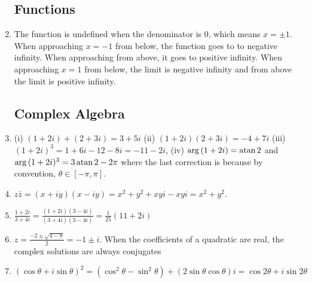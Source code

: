 \documentclass{article}
\begin{document}
\begin{enumerate}
\subsection{Functions}
    \item The function is undefined when the denominator is $0$, which means $x=\pm 1$. When approaching $x=-1$ from below, the function goes to to negative infinity. When approaching from above, it goes to positive infinity. When approaching $x=1$ from below, the limit is negative infinity and from above the limit is positive infinity.
\newpage
\subsection{Complex Algebra}
    \item (i) $(1+2i)+(2+3i)=3+5i$ (ii) $(1+2i)(2+3i)=-4+7i$ (iii) $(1+2i)^3=1+6i-12-8i=-11-2i$, (iv) $\arg{(1+2i)}=\atan{2}$ and $\arg{(1+2i)^3}=3\atan{2}-2\pi$ where the last correction is because by convention, $\theta \in [-\pi, \pi]$.
    \item $z \bar{z}= (x+iy)(x-iy)=x^2 + y^2 +xyi - xyi=x^2+y^2$.
    \item $\frac{1+2i}{3+4i} = \frac{(1+2i)(3-4i)}{(3+4i)(3-4i)}=\frac{1}{25} (11+2i)$
    \item $z=\frac{-2\pm \sqrt{4-8}}{2} = -1 \pm i$. When the coefficients of a quadratic are real, the complex solutions are always conjugates
    \item $(\cos{\theta}+i \sin{\theta})^2=(\cos^2{\theta}-\sin^2{\theta})+(2\sin{\theta}\cos{\theta}) i=\cos{2\theta}+i\sin{2 \theta}$

\end{enumerate}
\end{document}
